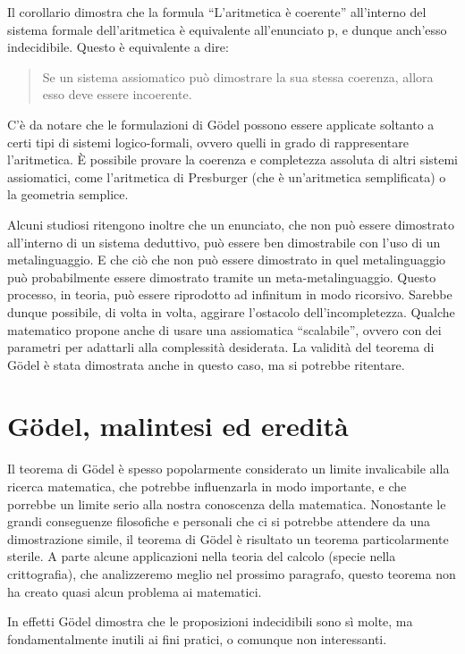 \documentclass[a4paper,10pt]{article}
\begin{document}
Il corollario dimostra che la formula “L'aritmetica è coerente” all'interno del sistema formale dell'aritmetica è equivalente all'enunciato p, e dunque anch'esso indecidibile. Questo è equivalente a dire:

\begin{quote}
Se un sistema assiomatico può dimostrare la sua stessa coerenza, allora esso deve essere incoerente.
\end{quote}

C'è da notare che le formulazioni di Gödel possono essere applicate soltanto a certi tipi di sistemi logico-formali, ovvero quelli in grado di rappresentare l'aritmetica. È possibile provare la coerenza e completezza assoluta di altri sistemi assiomatici, come l'aritmetica di Presburger (che è un'aritmetica semplificata) o la geometria semplice.

Alcuni studiosi ritengono inoltre che un enunciato, che non può essere dimostrato all'interno di un sistema deduttivo, può essere ben dimostrabile con l'uso di un metalinguaggio.
E che ciò che non può essere dimostrato in quel metalinguaggio può probabilmente essere dimostrato tramite un meta-metalinguaggio.
Questo processo, in teoria, può essere riprodotto ad infinitum in modo ricorsivo. Sarebbe dunque possibile, di volta in volta, aggirare l'ostacolo dell'incompletezza.
Qualche matematico propone anche di usare una assiomatica “scalabile”, ovvero con dei parametri per adattarli alla complessità desiderata.
La validità del teorema di Gödel è stata dimostrata anche in questo caso, ma si potrebbe ritentare.

\section{Gödel, malintesi ed eredità}
Il teorema di Gödel è spesso popolarmente considerato un limite invalicabile alla ricerca matematica, che potrebbe influenzarla in modo importante, e che porrebbe un limite serio alla nostra conoscenza della matematica.
Nonostante le grandi conseguenze filosofiche e personali che ci si potrebbe attendere da una dimostrazione simile, il teorema di Gödel è risultato un teorema particolarmente sterile. A parte alcune applicazioni nella teoria del calcolo (specie nella crittografia), che analizzeremo meglio nel prossimo paragrafo, questo teorema non ha creato quasi alcun problema ai matematici.

In effetti Gödel dimostra che le proposizioni indecidibili sono sì molte, ma fondamentalmente inutili ai fini pratici, o comunque non interessanti.
\end{document}
